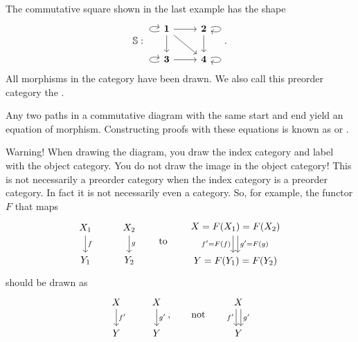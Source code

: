\begin{example}
The commutative square shown in the last example has the shape
\[ \mathbb{S}: \begin{tikzcd}
\boldsymbol{1} \ar[loop left] \ar[r] \ar[dr] \ar[d] & \boldsymbol{2} \ar[d] \ar[loop right] \\
\boldsymbol{3} \ar[loop left] \ar[r] & \boldsymbol{4} \ar[loop right]
\end{tikzcd}. \]
All morphisms in the category have been drawn. We also call this preorder category the .
\end{example}

Any two paths in a commutative diagram with the same start and end yield an equation of morphism. Constructing proofs with these equations is known as  or .

\begin{example}
Warning! When drawing the diagram, you draw the index category and label with the object category. You do not draw the image in the object category! This is not necessarily a preorder category when the index category is a preorder category. In fact it is not necessarily even a category. So, for example, the functor $F$ that maps
\[ \begin{tikzcd}
X_1 \dar{f} & X_2 \dar{g} \\ Y_1 & Y_2
\end{tikzcd} \qquad\text{to}\qquad \begin{tikzcd}
X = F(X_1) = F(X_2) \ar[d, shift right, swap, "f' = F(f)"] \ar[d, shift left, "g' = F(g)"] \\ Y = F(Y_1) = F(Y_2)
\end{tikzcd}  \]
should be drawn as
\[ \begin{tikzcd}
X \dar{f'} & X \dar{g'} \\ Y & Y
\end{tikzcd}, \qquad\text{not}\qquad \begin{tikzcd}
X \ar[d, swap, shift right, "f'"] \ar[d, shift left, "g'"] \\ Y
\end{tikzcd} \]
\end{example}


